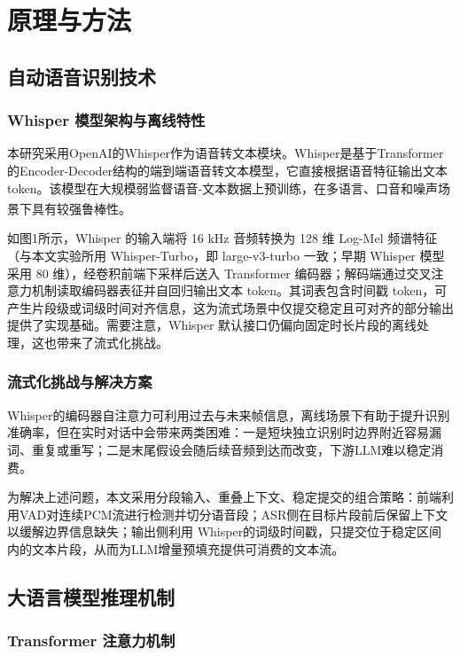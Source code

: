 \documentclass[UTF8,a4paper,zihao=5]{ctexart}
\newcommand{\upcite}[1]{\textsuperscript{\cite{#1}}}
\begin{document}
\section{原理与方法}

\subsection{自动语音识别技术}

\subsubsection{Whisper 模型架构与离线特性}

本研究采用OpenAI的Whisper作为语音转文本模块。Whisper是基于Transformer的Encoder-Decoder结构的端到端语音转文本模型，它直接根据语音特征输出文本token。该模型在大规模弱监督语音-文本数据上预训练，在多语言、口音和噪声场景下具有较强鲁棒性\upcite{ref12}。

如图1所示，Whisper 的输入端将 16 kHz 音频转换为 128 维 Log-Mel 频谱特征（与本文实验所用 Whisper-Turbo，即 large-v3-turbo 一致；早期 Whisper 模型采用 80 维），经卷积前端下采样后送入 Transformer 编码器；解码端通过交叉注意力机制读取编码器表征并自回归输出文本 token。其词表包含时间戳 token，可产生片段级或词级时间对齐信息，这为流式场景中仅提交稳定且可对齐的部分输出提供了实现基础。需要注意，Whisper 默认接口仍偏向固定时长片段的离线处理，这也带来了流式化挑战。

\subsubsection{流式化挑战与解决方案}

Whisper的编码器自注意力可利用过去与未来帧信息，离线场景下有助于提升识别准确率，但在实时对话中会带来两类困难：一是短块独立识别时边界附近容易漏词、重复或重写；二是末尾假设会随后续音频到达而改变，下游LLM难以稳定消费。

为解决上述问题，本文采用分段输入、重叠上下文、稳定提交的组合策略：前端利用VAD对连续PCM流进行检测并切分语音段；ASR侧在目标片段前后保留上下文以缓解边界信息缺失；输出侧利用 Whisper的词级时间戳，只提交位于稳定区间内的文本片段，从而为LLM增量预填充提供可消费的文本流。

\subsection{大语言模型推理机制}

\subsubsection{Transformer 注意力机制}
\end{document}
